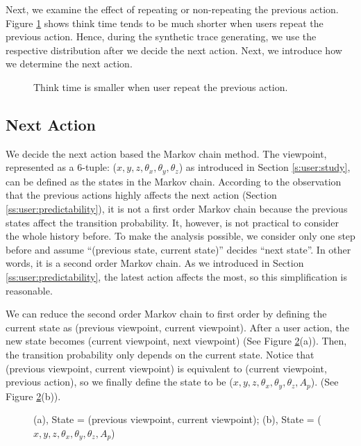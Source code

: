 Next, we examine the effect of repeating or non-repeating the previous action. 
Figure \ref{f:user:thinktime} shows %
think time tends to be much shorter when users repeat the previous action.
Hence, during the synthetic trace generating, we use the respective distribution after
we decide the next action. Next, we introduce how we determine the next action.
\begin{figure}
    \centering
    \caption{Think time is smaller when user repeat the previous action.}
    \label{f:user:thinktime}
\end{figure}

\subsection{Next Action}
We decide the next action based the Markov chain method.
The viewpoint, represented as a 6-tuple: ($x, y, z, \theta_x, \theta_y, \theta_z$)
as introduced in Section \ref{s:user:study}, can be defined as the states in the Markov chain.
According to the observation that the previous actions highly affects the next action
(Section \ref{ss:user:predictability}), it is not a first order Markov chain because
the previous states affect the transition probability. 
It, however, is not practical to consider the whole history before. 
To make the analysis possible, we consider only one step before and assume
``(previous state, current state)'' decides ``next state''. In other words, 
it is a second order Markov chain. 
As we introduced in Section \ref{ss:user:predictability}, the latest action affects the most, so
this simplification is reasonable.

We can reduce the second order Markov chain to first order by defining the current state as
(previous viewpoint, current viewpoint). After a user action, the new state becomes 
(current viewpoint, next viewpoint) (See Figure \ref{f:user:reduction}(a)). 
Then, the transition probability only depends on the current state.
Notice that (previous viewpoint, current viewpoint) is equivalent to (current viewpoint, previous action), 
so we finally define the state to be ($x, y, z, \theta_x, \theta_y, \theta_z, A_p$). 
(See Figure \ref{f:user:reduction}(b)).
\begin{figure}
    \centering
    \caption[Two equivalent definitions of state.]{(a), State = (previous viewpoint, current viewpoint); (b), State = ($x, y, z, \theta_x, \theta_y, \theta_z, A_p$)}
    \label{f:user:reduction}
\end{figure}

